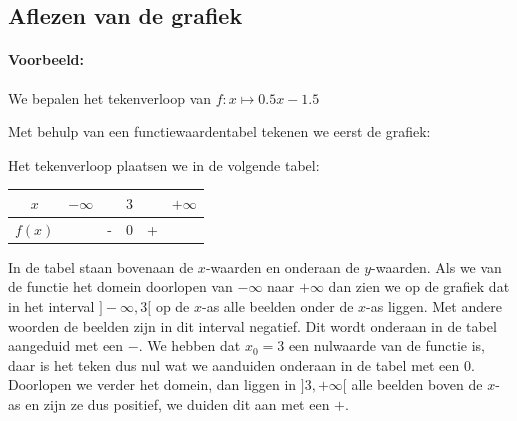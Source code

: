 \documentclass[12pt,twoside]{article}
\begin{document}
\subsection{Aflezen van de grafiek}

\paragraph*{Voorbeeld:} We bepalen het tekenverloop van $f: x\mapsto 0.5 x -1.5$

Met behulp van een functiewaardentabel tekenen we eerst de grafiek:

\begin{center}
\end{center}

Het tekenverloop plaatsen we in de volgende tabel:

\begin{center}
  \begin{tabular}{c|lcccr}
  $x$ & $-\infty$ & & $3$ & & $+\infty$\\
  \hline
  $f(x)$ & & - & 0 & + &
  \end{tabular}
\end{center}

In de tabel staan bovenaan de $x$-waarden en onderaan de $y$-waarden. Als we van de functie het domein doorlopen van $-\infty$ naar $+\infty$ dan zien we op de grafiek dat in het interval $]-\infty,3[$ op de $x$-as alle beelden onder de $x$-as liggen. Met andere woorden de beelden zijn in dit interval negatief. Dit wordt onderaan in de tabel aangeduid met een $-$. We hebben dat $x_0=3$ een nulwaarde van de functie is, daar is het teken dus nul wat we aanduiden onderaan in de tabel met een $0$. Doorlopen we verder het domein, dan liggen in $]3,+\infty[$ alle beelden boven de $x$-as en zijn ze dus positief, we duiden dit aan met een $+$.
\end{document}
